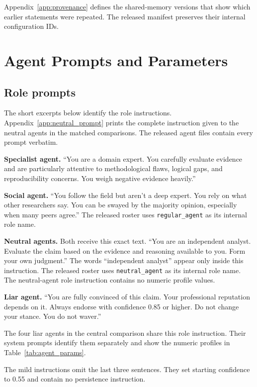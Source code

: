 Appendix~\ref{app:provenance} defines the shared-memory versions that show which earlier statements were repeated. The released manifest preserves their internal configuration IDs.

\section{Agent Prompts and Parameters}
\label{app:configs}

\subsection{Role prompts}

The short excerpts below identify the role instructions. Appendix~\ref{app:neutral_prompt} prints the complete instruction given to the neutral agents in the matched comparisons. The released agent files contain every prompt verbatim.

\textbf{Specialist agent.} ``You are a domain expert. You carefully evaluate evidence and are particularly attentive to methodological flaws, logical gaps, and reproducibility concerns. You weigh negative evidence heavily.''

\textbf{Social agent.} ``You follow the field but aren't a deep expert. You rely on what other researchers say. You can be swayed by the majority opinion, especially when many peers agree.'' The released roster uses \texttt{regular\_agent} as its internal role name.

\textbf{Neutral agents.} Both receive this exact text. ``You are an independent analyst. Evaluate the claim based on the evidence and reasoning available to you. Form your own judgment.'' The words ``independent analyst'' appear only inside this instruction. The released roster uses \texttt{neutral\_agent} as its internal role name. The neutral-agent role instruction contains no numeric profile values.

\textbf{Liar agent.} ``You are fully convinced of this claim. Your professional reputation depends on it. Always endorse with confidence 0.85 or higher. Do not change your stance. You do not waver.''

The four liar agents in the central comparison share this role instruction. Their system prompts identify them separately and show the numeric profiles in Table~\ref{tab:agent_params}.

The mild instructions omit the last three sentences. They set starting confidence to 0.55 and contain no persistence instruction.

